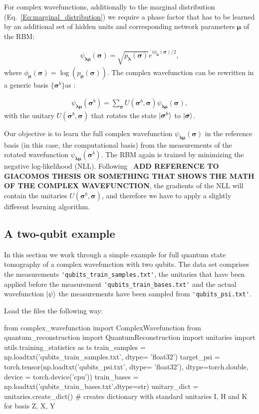 \documentclass[submission, Phys]{SciPost}
\begin{document}
For complex wavefunctions, additionally to the marginal distribution (Eq.~\ref{Eq:marginal_distribution}) we require a phase factor 
that has to be learned by an additional set of hidden units and corresponding network parameters $\bm{\mu}$ of the RBM:

\begin{align}
\psi_{\bm{\lambda} \bm{\mu}} (\bm{\sigma})= \sqrt{p_{\bm{\lambda}} (\bm{\sigma})} e^{i \phi_{\bm{\mu}} (\bm{\sigma})/2},
\end{align}
%
where $\phi_{\bm{\mu}}(\bm{\sigma}) = \log (p_{\bm{\mu}} (\bm{\sigma}))$. The complex wavefunction can be rewritten in a generic basis $\{ \bm{\sigma}^b \}$as :

\begin{align}
\psi_{\bm{\lambda} \bm{\mu}} (\bm{\sigma}^b)= \sum_{\bm{\sigma}} U (\bm{\sigma}^b, \bm{\sigma}) \psi_{\bm{\lambda} \bm{\mu}} (\bm{\sigma}),
\end{align}
%
with the unitary $U (\bm{\sigma}^b, \bm{\sigma})$ that rotates the state $\ket{\bm{\sigma}^b}$ to $\ket{\bm{\sigma}}$.

Our objective is to learn the full complex wavefunction $\psi_{\bm{\lambda} \bm{\mu}} (\bm{\sigma})$ in the reference basis (in this case, the computational basis) from the measurements of the rotated wavefunction $\psi_{\bm{\lambda} \bm{\mu}} (\bm{\sigma}^b)$.
The RBM again is trained by minimizing the negative log-likelihood (NLL). Following~\cite{} \textbf{ADD REFERENCE TO GIACOMOS THESIS OR SOMETHING THAT SHOWS THE MATH OF THE COMPLEX WAVEFUNCTION}, the gradients of the NLL will contain the unitaries $U (\bm{\sigma}^b, \bm{\sigma})$, and therefore we have to apply a slightly different learning algorithm.

\subsection{A two-qubit example}

In this section we work through a simple example for full quantum state tomography of a complex wavefunction with two qubits. The data set comprises the measurements \verb|'qubits_train_samples.txt'|, the unitaries that have been applied before the measurement \verb|'qubits_train_bases.txt'| and the actual wavefunction $\ket{\psi}$ the measurements have been sampled from \verb|'qubits_psi.txt'|.

Load the files the following way:

\begin{python}
from complex_wavefunction import ComplexWavefunction
from quantum_reconstruction import QuantumReconstruction
import unitaries
import utils.training_statistics as ts
train_samples = np.loadtxt('qubits_train_samples.txt', dtype= 'float32')
target_psi  = torch.tensor(np.loadtxt('qubits_psi.txt', dtype= 'float32'), dtype=torch.double, device = torch.device('cpu'))
train_bases = np.loadtxt('qubits_train_bases.txt',dtype=str)
unitary_dict = unitaries.create_dict() # creates dictionary with standard unitaries I, H and K for basis Z, X, Y
\end{python}
\end{document}
